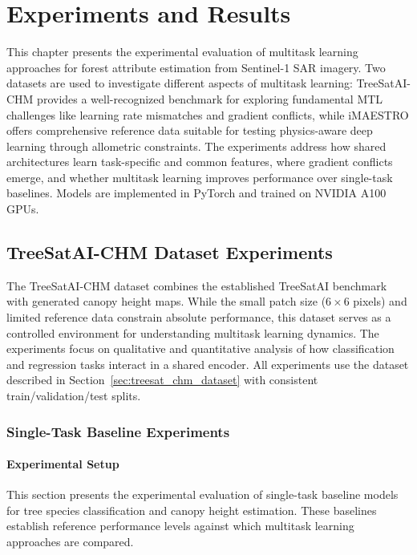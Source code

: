 \chapter{Experiments and Results}
\label{chap:experiments}

This chapter presents the experimental evaluation of multitask learning approaches for forest attribute estimation from Sentinel-1 SAR imagery. Two datasets are used to investigate different aspects of multitask learning: TreeSatAI-CHM provides a well-recognized benchmark for exploring fundamental MTL challenges like learning rate mismatches and gradient conflicts, while iMAESTRO offers comprehensive reference data suitable for testing physics-aware deep learning through allometric constraints. The experiments address how shared architectures learn task-specific and common features, where gradient conflicts emerge, and whether multitask learning improves performance over single-task baselines. Models are implemented in PyTorch and trained on NVIDIA A100 GPUs.

\section{TreeSatAI-CHM Dataset Experiments}
\label{sec:treesat_experiments}

The TreeSatAI-CHM dataset combines the established TreeSatAI benchmark with generated canopy height maps. While the small patch size ($6\times 6$ pixels) and limited reference data constrain absolute performance, this dataset serves as a controlled environment for understanding multitask learning dynamics. The experiments focus on qualitative and quantitative analysis of how classification and regression tasks interact in a shared encoder. All experiments use the dataset described in Section~\ref{sec:treesat_chm_dataset} with consistent train/validation/test splits.

\subsection{Single-Task Baseline Experiments}
\label{subsec:treesat_baselines}

\subsubsection{Experimental Setup}

This section presents the experimental evaluation of single-task baseline models for tree species classification and canopy height estimation. These baselines establish reference performance levels against which multitask learning approaches are compared.

